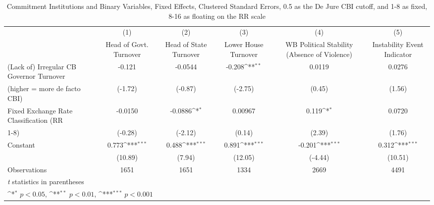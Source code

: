 \begin{table}[htbp]\centering
\def\sym#1{\ifmmode^{#1}\else\(^{#1}\)\fi}
\caption{Commitment Institutions and Binary Variables, Fixed Effects, Clustered Standard Errors, 0.5 as the De Jure CBI cutoff, and 1-8 as fixed, 8-16 as floating on the RR scale \label{binaryIndFEDF}}
\begin{tabular}{l*{5}{c}}
\toprule
                                        &\multicolumn{1}{c}{(1)}&\multicolumn{1}{c}{(2)}&\multicolumn{1}{c}{(3)}&\multicolumn{1}{c}{(4)}&\multicolumn{1}{c}{(5)}\\
                                        &\multicolumn{1}{c}{Head of Govt. Turnover}&\multicolumn{1}{c}{Head of State Turnover}&\multicolumn{1}{c}{Lower House Turnover}&\multicolumn{1}{c}{WB Political Stability (Absence of Violence)}&\multicolumn{1}{c}{Instability Event Indicator}\\
\midrule
(Lack of) Irregular CB Governor Turnover&   -0.121         &  -0.0544         &   -0.208\sym{**} &   0.0119         &   0.0276         \\
(higher = more de facto CBI)            &  (-1.72)         &  (-0.87)         &  (-2.75)         &   (0.45)         &   (1.56)         \\
\addlinespace
Fixed Exchange Rate Classification (RR  &  -0.0150         &  -0.0886\sym{*}  &  0.00967         &    0.119\sym{*}  &   0.0720         \\
1-8)                                    &  (-0.28)         &  (-2.12)         &   (0.14)         &   (2.39)         &   (1.76)         \\
\addlinespace
Constant                                &    0.773\sym{***}&    0.488\sym{***}&    0.891\sym{***}&   -0.201\sym{***}&    0.312\sym{***}\\
                                        &  (10.89)         &   (7.94)         &  (12.05)         &  (-4.44)         &  (10.51)         \\
\midrule
Observations                            &     1651         &     1651         &     1334         &     2669         &     4491         \\
\bottomrule
\multicolumn{6}{l}{\footnotesize \textit{t} statistics in parentheses}\\
\multicolumn{6}{l}{\footnotesize \sym{*} \(p<0.05\), \sym{**} \(p<0.01\), \sym{***} \(p<0.001\)}\\
\end{tabular}
\end{table}
